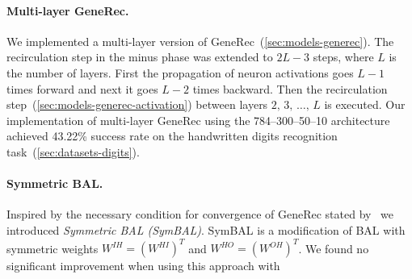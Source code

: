 \paragraph{Multi-layer GeneRec.}
\label{sec:sim-our-generec-multi} 

We implemented a multi-layer version of GeneRec~(\ref{sec:models-generec}). The recirculation step in the minus phase was extended to $2L-3$ steps, where $L$ is the number of layers. First the propagation of neuron activations goes $L-1$ times forward and next it goes $L-2$ times backward. Then the recirculation step~(\ref{sec:models-generec-activation}) between layers $2,\,3,\,\ldots,\,L$ is executed. Our implementation of multi-layer GeneRec using the 784--300--50--10 architecture achieved 43.22\% success rate on the handwritten digits recognition task~(\ref{sec:datasets-digits}). 


\paragraph{Symmetric BAL.} 
Inspired by the necessary condition for convergence of GeneRec stated by~\citet{o1996bio} we introduced \emph{Symmetric BAL (SymBAL)}. SymBAL is a modification of BAL with symmetric weights $W^{IH} = (W^{HI})^T$ and $W^{HO} = (W^{OH})^T$. We found no significant improvement when using this approach with 
